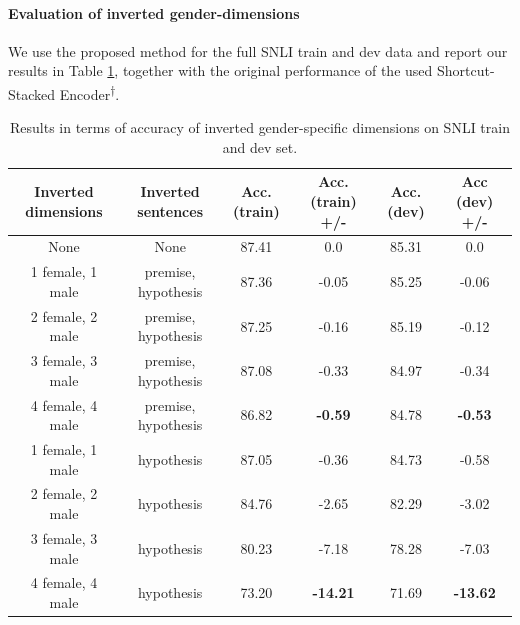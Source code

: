 \paragraph*{Evaluation of inverted gender-dimensions}
We use the proposed method for the full \ac{SNLI} train and dev data and report our results in Table \ref{tab:inverted_mf_results_acc}, together with the original performance of the used Shortcut-Stacked Encoder\textsuperscript{$\dagger$}. 
\begin{table}[tph!]
\centering
\begin{tabular}{cccccc}
\textbf{Inverted dimensions} & \textbf{Inverted sentences}  & \textbf{Acc. (train)} & \textbf{Acc. (train) +/-} & \textbf{Acc. (dev)} & \textbf{Acc (dev) +/-} \\
\toprule
None                   & None                   & 87.41        & 0.0              & 85.31      & 0.0           \\
\midrule
1 female, 1 male    & premise, hypothesis & 87.36        & -0.05            & 85.25      & -0.06         \\
2 female, 2 male    & premise, hypothesis & 87.25        & -0.16            & 85.19      & -0.12         \\
3 female, 3 male    & premise, hypothesis & 87.08        & -0.33            & 84.97      & -0.34         \\
4 female, 4 male    & premise, hypothesis & 86.82        & \textbf{-0.59}            & 84.78      & \textbf{-0.53}         \\
\midrule
1 female, 1 male    & hypothesis          & 87.05        & -0.36            & 84.73      & -0.58         \\
2 female, 2 male    & hypothesis          & 84.76        & -2.65            & 82.29      & -3.02         \\
3 female, 3 male    & hypothesis          & 80.23        & -7.18            & 78.28      & -7.03         \\
4 female, 4 male    & hypothesis           & 73.20        & \textbf{-14.21}           & 71.69      & \textbf{-13.62}    \\
\bottomrule    
\end{tabular}
\caption{Results in terms of accuracy of inverted gender-specific dimensions on \ac{SNLI} train and dev set.}
\label{tab:inverted_mf_results_acc}
\end{table}
